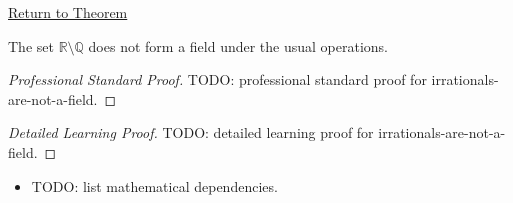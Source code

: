 \newpage
{}
\label{prf:irrationals-are-not-a-field}

\begin{remark*}[Return]
\hyperref[cor:irrationals-are-not-a-field]{Return to Theorem}
\end{remark*}

\begin{corollary*}
The set $\mathbb{R}\setminus\mathbb{Q}$ does not form a field under the usual
operations.
\end{corollary*}

\begin{proof}[Professional Standard Proof]
\LRAProofBodyStart
TODO: professional standard proof for irrationals-are-not-a-field.
\end{proof}

\begin{proof}[Detailed Learning Proof]
\LRAProofBodyStart
TODO: detailed learning proof for irrationals-are-not-a-field.
\end{proof}

\begin{remark*}
\end{remark*}

\begin{dependencies}
\begin{itemize}
  \item TODO: list mathematical dependencies.
\end{itemize}
\end{dependencies}

\clearpage
